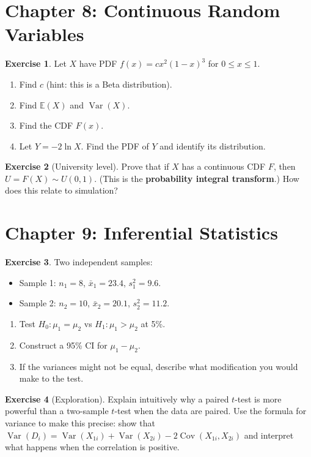 \documentclass[12pt, a4paper, oneside]{book}
\theoremstyle{definition}
\newtheorem{exercise}{Exercise}[section]
\theoremstyle{plain}
\theoremstyle{remark}
\newcommand{\E}{\mathbb{E}}
\newcommand{\Var}{\operatorname{Var}}
\newcommand{\Cov}{\operatorname{Cov}}
\begin{document}
\section*{Chapter 8: Continuous Random Variables}

\begin{exercise}
Let $X$ have PDF $f(x)=cx^2(1-x)^3$ for $0\le x\le1$.
\begin{enumerate}[label=\textbf{(\alph*)}]
  \item Find $c$ (hint: this is a Beta distribution).
  \item Find $\E(X)$ and $\Var(X)$.
  \item Find the CDF $F(x)$.
  \item Let $Y=-2\ln X$.  Find the PDF of $Y$ and identify its distribution.
\end{enumerate}
\end{exercise}

\begin{exercise}[University level]
Prove that if $X$ has a continuous CDF $F$, then $U=F(X)\sim U(0,1)$.
(This is the \textbf{probability integral transform}.)  How does this
relate to simulation?
\end{exercise}

\section*{Chapter 9: Inferential Statistics}

\begin{exercise}
Two independent samples:
\begin{itemize}
  \item Sample 1: $n_1=8$, $\bar{x}_1=23.4$, $s_1^2=9.6$.
  \item Sample 2: $n_2=10$, $\bar{x}_2=20.1$, $s_2^2=11.2$.
\end{itemize}
\begin{enumerate}[label=\textbf{(\alph*)}]
  \item Test $H_0:\mu_1=\mu_2$ vs $H_1:\mu_1>\mu_2$ at 5\%.
  \item Construct a 95\% CI for $\mu_1-\mu_2$.
  \item If the variances might not be equal, describe what modification
        you would make to the test.
\end{enumerate}
\end{exercise}

\begin{exercise}[Exploration]
Explain intuitively why a paired $t$-test is more powerful than a two-sample
$t$-test when the data are paired.  Use the formula for variance to make
this precise: show that $\Var(D_i)=\Var(X_{1i})+\Var(X_{2i})-2\Cov(X_{1i},X_{2i})$
and interpret what happens when the correlation is positive.
\end{exercise}
\end{document}
